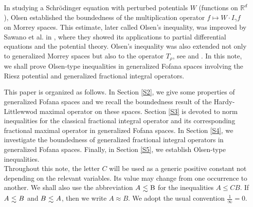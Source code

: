 \documentclass[a4paper,12pt,intlimits,oneside]{amsart}
\numberwithin{equation}{section}
\numberwithin{equation}{section}
\def\lsim{\raisebox{-1ex}{$~\stackrel{\textstyle <}{\sim}~$}}
\theoremstyle{definition}
\begin{document}
In studying a Schr\"odinger equation with perturbed potentials $ W  $ (functions on $ \mathbb{R}^{d} $), Olsen \cite{Ol} established
the boundedness of the multiplication operator $ f \mapsto W \cdot I_{\gamma}f$ on Morrey spaces. This estimate, later called Olsen's inequality, was improved by Sawano et al. in \cite{SST}, where they showed its applications to partial differential equations and the potential theory.  Olsen's inequality was also extended not only to generalized Morrey spaces but also to the operator $T_{\rho}$, see \cite{GE} and \cite{KNS}. In this note, we shall prove Olsen-type inequalities in generalized Fofana spaces involving the Riesz potential and generalized fractional integral operators. 

      
This paper is organized as follows. In Section \ref{S2}, we give some properties of generalized Fofana spaces and we recall the boundedness result of the Hardy-Littlewwod maximal operator on these spaces. Section \ref{S3} is devoted to norm inequalities for the classical fractional integral operator and its corresponding fractional maximal operator in generalized Fofana spaces. In Section \ref{S4}, we investigate the boundedness of generalized fractional integral operators in generalized Fofana spaces. Finally, in Section \ref{S5}, we establish Olsen-type inequalities. \\ 
Throughout this note, the letter $C$ will be used as a generic positive constant not depending on the relevant variables. Its value may change from one occurrence to another. We shall also use the abbreviation $ A \lsim \mathrm{ B}$ for the inequalities $ A\leq C B$. If $ A \lsim B$ and $ B \lsim  A$, then we write $ A\approx  B$. We adopt the usual convention $\frac{1}{\infty} =0$.
\end{document}

